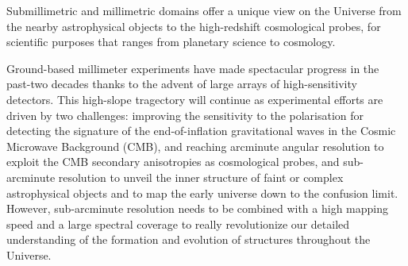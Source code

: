 

Submillimetric and millimetric domains offer a unique view on the
Universe from the nearby astrophysical objects to the high-redshift
cosmological probes, for scientific purposes that ranges from
planetary science to cosmology.

Ground-based millimeter experiments have made spectacular progress in
the past-two decades thanks to the advent of large arrays of
high-sensitivity detectors. %
This high-slope tragectory will continue as experimental efforts are
driven by two challenges: improving the sensitivity to the
polarisation for detecting the signature of
the end-of-inflation gravitational waves in the Cosmic Microwave
Background (CMB), and reaching arcminute angular resolution to exploit
the CMB secondary anisotropies as cosmological probes, and
sub-arcminute resolution to unveil the inner structure of
faint or complex astrophysical objects and to map the early universe
down to the confusion limit. However, sub-arcminute
resolution needs to be combined with a high mapping speed and a large
spectral coverage to really revolutionize our detailed understanding
of the formation and evolution of structures throughout the Universe.

